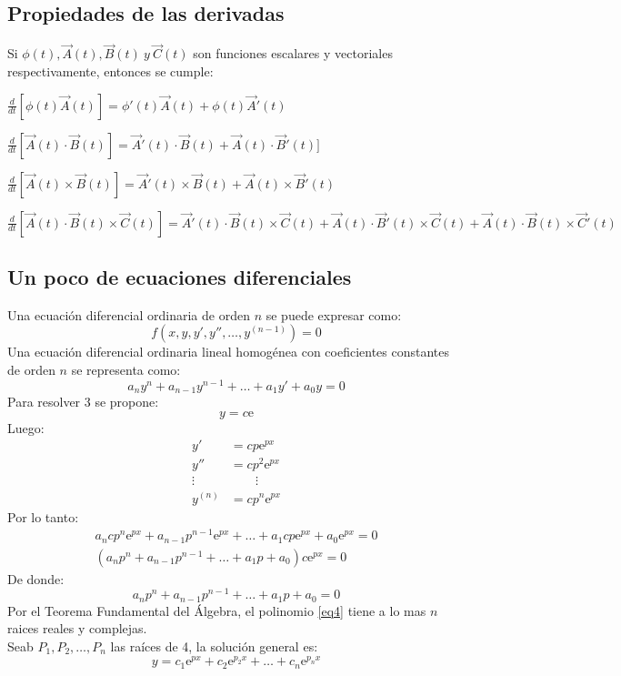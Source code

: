 \documentclass[a4paper]{article}
\newcommand{\euler}{\mathrm{e}}
\begin{document}
\subsection{Propiedades de las derivadas}
Si $\phi(t),\vec{A}(t),\vec{B}(t)\ y\ \vec{C}(t)$ son funciones escalares y vectoriales respectivamente, entonces se cumple:
\begin{enumerate}
{\item $\frac{d}{dt}[\phi(t)\vec{A}(t)]=\phi'(t)\vec{A}(t)+\phi(t)\vec{A}'(t)$}
{\item $\frac{d}{dt}[\vec{A}(t)\cdot\vec{B}(t)]=\vec{A}'(t)\cdot\vec{B}(t)+\vec{A}(t)\cdot\vec{B}'(t)]$}
{\item $\frac{d}{dt}[\vec{A}(t)\times\vec{B}(t)]=\vec{A}'(t)\times\vec{B}(t)+\vec{A}(t)\times\vec{B}'(t)$}
{\item $\frac{d}{dt}[\vec{A}(t)\cdot\vec{B}(t)\times\vec{C}(t)]=\vec{A}'(t)\cdot\vec{B}(t)\times\vec{C}(t)+\vec{A}(t)\cdot\vec{B}'(t)\times\vec{C}(t)+\vec{A}(t)\cdot\vec{B}(t)\times\vec{C}'(t)$}
\end{enumerate}
\subsection{Un poco de ecuaciones diferenciales}
Una ecuación diferencial ordinaria de orden $n$ se puede expresar como:
\[f(x,y,y',y'',\ldots,y^{(n-1)})=0\]
Una ecuación diferencial ordinaria lineal homogénea con coeficientes constantes de orden $n$ se representa como:
\begin{equation}
a_ny^n+a_{n-1}y^{n-1}+\ldots+a_1y'+a_0y=0
\end{equation}
Para resolver 3 se propone:
\[y=c\euler\]
Luego:
\begin{align*}
y'&=cp\euler^{px}\\
y''&=cp^2\euler^{px}\\
\vdots&\hspace{2em}\vdots\\
y^{(n)}&=cp^n\euler^{px}
\end{align*}
Por lo tanto:
\begin{gather*}
a_ncp^n\euler^{px}+a_{n-1}p^{n-1}\euler^{px}+\ldots+a_1cp\euler^{px}+a_0\euler^{px}=0\\
(a_np^n+a_{n-1}p^{n-1}+\ldots +a_1p+a_0)c\euler^{px}=0
\end{gather*}
De donde:
\begin{equation}
\label{eq4}
a_np^n+a_{n-1}p^{n-1}+\ldots+a_1p+a_0=0
\end{equation}
Por el Teorema Fundamental del Álgebra, el polinomio \ref{eq4} tiene a lo mas $n$ raices reales y complejas.\\
Seab $P_1,P_2,\ldots,P_n$ las raíces de 4, la solución general es:
\[y=c_1\euler^{px}+c_2\euler^{p_2x}+\ldots+c_n\euler^{p_{n}x}\]
\end{document}
